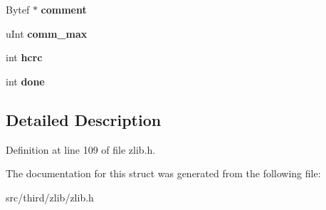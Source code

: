 \begin{DoxyCompactItemize}
\item 
\hypertarget{structgz__header_a12494f0a21cd71356bb2eb9f1abf9743}{Bytef $\ast$ {\bfseries comment}}\label{dc/d47/structgz__header_a12494f0a21cd71356bb2eb9f1abf9743}

\item 
\hypertarget{structgz__header_a9a86a6f486d381aa55dcaa1451f38fc1}{u\-Int {\bfseries comm\-\_\-max}}\label{dc/d47/structgz__header_a9a86a6f486d381aa55dcaa1451f38fc1}

\item 
\hypertarget{structgz__header_a2a7bc80ae487368f31c86140848835b0}{int {\bfseries hcrc}}\label{dc/d47/structgz__header_a2a7bc80ae487368f31c86140848835b0}

\item 
\hypertarget{structgz__header_a0f32d102ac6b1a49a0065088ce4e7a11}{int {\bfseries done}}\label{dc/d47/structgz__header_a0f32d102ac6b1a49a0065088ce4e7a11}

\end{DoxyCompactItemize}


\subsection{Detailed Description}


Definition at line 109 of file zlib.\-h.



The documentation for this struct was generated from the following file\-:\begin{DoxyCompactItemize}
\item 
src/third/zlib/zlib.\-h\end{DoxyCompactItemize}
